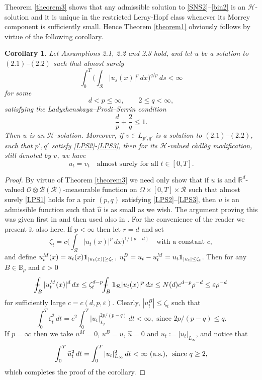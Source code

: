 \documentclass[11pt,reqno]{amsart}
\newtheorem{corollary}[theorem]{Corollary}
\theoremstyle{definition}
\theoremstyle{remark}
\newcommand\bR{\mathbb{R}}
\newcommand\bB{\mathbb{B}}
\newcommand\cB{\mathcal{B}}
\newcommand\cH{\mathcal{H}}
\newcommand\cO{\mathcal{O}}
\newcommand\cR{\mathcal{R}}
\newcommand{\<}{\langle}
\renewcommand{\>}{\rangle}
\def\Xint#1{\mathchoice
{\XXint\displaystyle\textstyle{#1}}%
{\XXint\textstyle\scriptstyle{#1}}%
{\XXint\scriptstyle\scriptscriptstyle{#1}}%
{\XXint\scriptscriptstyle\scriptscriptstyle{#1}}%
\!\int}
\def\XXint#1#2#3{{\setbox0=\hbox{$#1{#2#3}{\int}$ }
\vcenter{\hbox{$#2#3$ }}\kern-.6\wd0}}
\def\dashint{\Xint-}
\begin{document}
Theorem \ref{theorem3} shows that any admissible solution to \eqref{SNS2}--\eqref{bin2}
is an  $\cH$-solution and it is unique in the restricted Leray-Hopf class 
whenever its Morrey component is sufficiently small. 
Hence Theorem \ref{theorem1} obviously follows by virtue of the 
following corollary.  
\begin{corollary}
                                                               \label{corollary1}
Let Assumptions 2.1, 2.2 and 2.3 hold, and let $u$ be a solution to
$(2.1)$--$(2.2)$ such that almost surely 
\begin{equation}
                                                        \label{LPS1}
\int_0^T\Big( \int_{\cR}|u_s(x)|^p\,dx\Big)^{q/p}\,ds < \infty
\end{equation}
for some
\begin{equation}
                                                                  \label{LPS2}
d<p\le\infty,
\qquad
2\le q<\infty,
\end{equation}
satisfying the Ladyzhenskaya--Prodi--Serrin condition
\begin{equation}
                                                                   \label{LPS3}
\frac{d}{p}+\frac{2}{q}\le1.
\end{equation}
Then $u$ is an $\mathcal H$-solution. Moreover, if $v\in L_{p',q'}$ is a solution 
to $(2.1)$--$(2.2)$, such that $p',q'$ satisfy \eqref{LPS2}-\eqref{LPS3},  
then for its $\mathcal H$-valued c\`adl\`ag modification,
still denoted by $v$, we have 
$$
u_t=v_t\quad\text{almost surely for all } t\in[0,T]. 
$$
\end{corollary}
\begin{proof}
By virtue of Theorem \ref{theorem3} we need only show that if 
$u$ is and $\bR^d$-valued  $\cO\otimes\cB(\cR)$-measurable 
function on $\Omega\times[0,T]\times\cR$ 
such that almost surely \eqref{LPS1} holds for a pair $(p,q)$ satisfying 
\eqref{LPS2}--\eqref{LPS3}, then $u$ is an admissible function 
such that $\hat u$ is as small as we wish.  
The argument proving this was given first in \cite{K2022b} and then 
used also in \cite{GK2026}. For the convenience of the reader 
we present it also here. 
If $p<\infty$ then let $r=d$ and set 
$$
\zeta_t=c\Big(\int_{\cR}
|u_t(x)|^{p }\,dx\Big)^{1/(p -d )} 
\quad\text{with a constant $c$}, 
$$
and define 
$u^{M}_t(x)=u_t(x){\bf1}_{|u_t(x)|\geq \zeta_t}$,
$u^B_t=u_t-u^M_t=u_t{\bf1}_{|u_t|\leq \zeta_t}$. 
Then for any $B\in\bB_{\rho}$ and $\varepsilon>0$ 
$$
\dashint_{B }|u^{M}_t(x)|^{d}\,dx
\leq \zeta_t^{d-p }
\dashint_{B }{\bf1}_{\cR}|u_t(x)|^{p }\,dx
\leq N(d)c^{d-p }\rho^{-d}\leq \varepsilon \rho^{-d}
$$
for sufficiently large $c=c(d,p,\varepsilon)$.  
Clearly, 
$|u_t^{B} |\leq \zeta_t $ such that  
$$
\int_{0}^{T}\zeta_t^{2}\,dt
=c^{2}\int_{0}^{T}|u_t|^{2p/(p-q) }_{L_p}
\,dt<\infty,\,\, \text{since $2p/(p-q)\leq q$.}
$$
 If $p=\infty$ then we take $u^M=0$, $u^B=u$, 
$\hat u=0$ and $\bar u_t:=|u_t|_{L_{\infty}}$,  and notice that 
$$
\int_0^T\bar u_t^2\,dt=\int_0^T|u_t|^2_{L_{\infty}}\,dt<\infty\,\,\text{(a.s.), 
\,\,since $q\geq 2$},
$$
which completes the proof of the corollary. 
\end{proof}
\end{document}
